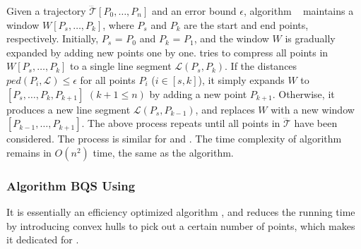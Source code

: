 Given a trajectory $\dddot{\mathcal{T}}[P_0, \ldots, P_n]$ and an error bound $\epsilon$, algorithm \opwa~\cite{Meratnia:Spatiotemporal} maintains a window $W[P_s, \ldots, P_k]$, where $P_s$ and $P_k$ are the start and end points, respectively. Initially, $P_s$ = $P_0$ and $P_k$ = $P_1$, and the window $W$ is gradually expanded by adding new points one by one. \opwa tries to compress all points in $W[P_s, \ldots, P_k]$ to a single line segment $\mathcal{L}(P_{s}, P_{k})$. If the distances $ped(P_i, {\mathcal{L}})\le \epsilon$ for all points $P_i$ ($i\in[s, k]$), it simply expands $W$ to $[P_s, \ldots, P_k, P_{k+1}]$ $(k+1\le n)$ by adding a new point $P_{k+1}$. Otherwise, it produces a new line segment $\mathcal{L}(P_{s}, P_{k-1})$, and replaces $W$ with a new window $[P_{k-1},\ldots,P_{k+1}]$.  The above process repeats until all points in $\dddot{\mathcal{T}}$ have been considered. The process is similar for \sed and \dad.
%
%
The time complexity of algorithm \opwa remains in $O(n^2)$ time, the same as the \dpa algorithm.


\subsubsection{Algorithm BQS Using \ped \cite{Liu:BQS}}
It is essentially an efficiency optimized \opwa algorithm \cite{Meratnia:Spatiotemporal}, and reduces the running time by introducing convex hulls to pick out a certain number of points, which makes it dedicated for \ped.




